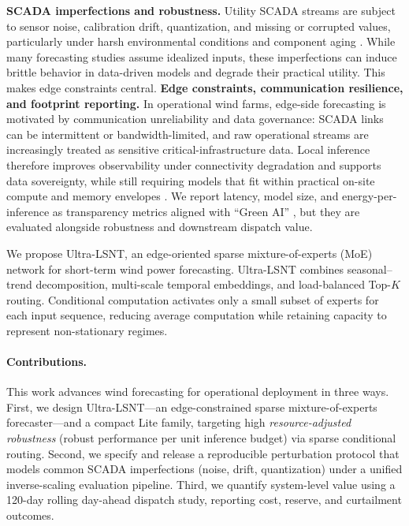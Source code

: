 \documentclass[review,3p,times]{elsarticle}
\begin{document}
\noindent\textbf{SCADA imperfections and robustness.} Utility SCADA streams are subject to sensor noise, calibration drift, quantization, and missing or corrupted values, particularly under harsh environmental conditions and component aging \cite{letzgus2020,schlechtingen2011}. While many forecasting studies assume idealized inputs, these imperfections can induce brittle behavior in data-driven models and degrade their practical utility. This makes edge constraints central. \noindent\textbf{Edge constraints, communication resilience, and footprint reporting.} In operational wind farms, edge-side forecasting is motivated by communication unreliability and data governance: SCADA links can be intermittent or bandwidth-limited, and raw operational streams are increasingly treated as sensitive critical-infrastructure data. Local inference therefore improves observability under connectivity degradation and supports data sovereignty, while still requiring models that fit within practical on-site compute and memory envelopes \cite{mwangi2024sdniiotedge,gooi2023edgeintelligence,zhou2019edge,wang2019edgewind}. We report latency, model size, and energy-per-inference as transparency metrics aligned with ``Green AI'' \cite{schwartz2020greenai,strubell2019energy}, but they are evaluated alongside robustness and downstream dispatch value.

We propose Ultra-LSNT, an edge-oriented sparse mixture-of-experts (MoE) network for short-term wind power forecasting. Ultra-LSNT combines seasonal--trend decomposition, multi-scale temporal embeddings, and load-balanced Top-$K$ routing. Conditional computation activates only a small subset of experts for each input sequence, reducing average computation while retaining capacity to represent non-stationary regimes.

\paragraph{Contributions.}
This work advances wind forecasting for operational deployment in three ways. First, we design Ultra-LSNT---an edge-constrained sparse mixture-of-experts forecaster---and a compact Lite family, targeting high \emph{resource-adjusted robustness} (robust performance per unit inference budget) via sparse conditional routing. Second, we specify and release a reproducible perturbation protocol that models common SCADA imperfections (noise, drift, quantization) under a unified inverse-scaling evaluation pipeline. Third, we quantify system-level value using a 120-day rolling day-ahead dispatch study, reporting cost, reserve, and curtailment outcomes.
\end{document}
